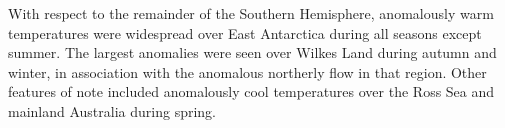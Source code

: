 With respect to the remainder of the Southern Hemisphere, anomalously warm temperatures were widespread over East Antarctica during all seasons except summer. The largest anomalies were seen over Wilkes Land during autumn and winter, in association with the anomalous northerly flow in that region. Other features of note included anomalously cool temperatures over the Ross Sea and mainland Australia during spring.

